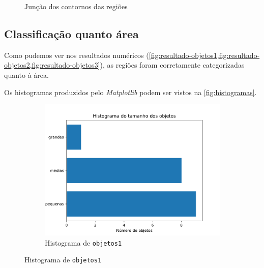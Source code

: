 \documentclass[brazilian,a4paper,twocolumn]{article}
\begin{document}
\begin{figure}[H]
            \caption{Junção dos contornos das regiões}
            \label{fig:isolamento-contornos}
        \end{figure}

    \subsection{Classificação quanto área}

        Como pudemos ver nos resultados numéricos (\cref{fig:resultado-objetos1,fig:resultado-objetos2,fig:resultado-objetos3}), as regiões foram corretamente categorizadas quanto à área.

        Os histogramas produzidos pelo \emph{Matplotlib} podem ser vistos na \cref{fig:histogramas}.

        \begin{figure}[H]
            \begin{subfigure}{0.48\textwidth}
                \includegraphics[width=\textwidth,keepaspectratio]{objetos1-histograma}
                \caption{Histograma de \texttt{objetos1}}
                \label{fig:objetos1-histograma}
            \end{subfigure}


\end{figure}
\end{document}
